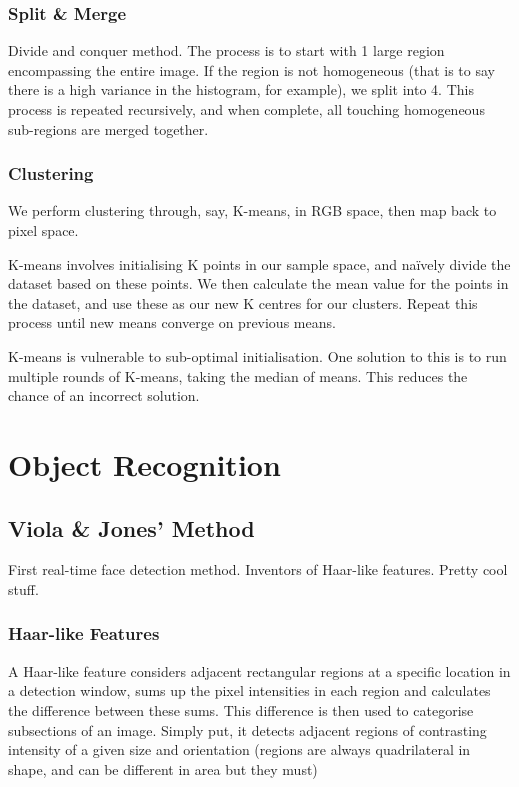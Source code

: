 \documentclass{article}
\begin{document}
        \subsubsection{Split \& Merge}
            Divide and conquer method. The process is to start with 1 large region encompassing the entire image. If the region is not homogeneous (that is to say there is a high variance in the histogram, for example), we split into 4. This process is repeated recursively, and when complete, all touching homogeneous sub-regions are merged together.
            
        \subsubsection{Clustering}
            We perform clustering through, say, K-means, in RGB space, then map back to pixel space.
        
            K-means involves initialising K points in our sample space, and naïvely divide the dataset based on these points. We then calculate the mean value for the points in the dataset, and use these as our new K centres for our clusters. Repeat this process until new means converge on previous means.
            
            K-means is vulnerable to sub-optimal initialisation. One solution to this is to run multiple rounds of K-means, taking the median of means. This reduces the chance of an incorrect solution.

\section{Object Recognition}

    \subsection{Viola \& Jones' Method}
    
        First real-time face detection method. Inventors of Haar-like features. Pretty cool stuff.
    
        \subsubsection{Haar-like Features}
        
            A Haar-like feature considers adjacent rectangular regions at a specific location in a detection window, sums up the pixel intensities in each region and calculates the difference between these sums. This difference is then used to categorise subsections of an image. Simply put, it detects adjacent regions of contrasting intensity of a given size and orientation (regions are always quadrilateral in shape, and can be different in area but they must)
            
\end{document}
